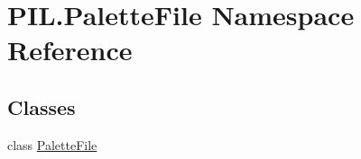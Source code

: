 \hypertarget{namespacePIL_1_1PaletteFile}{}\section{P\+I\+L.\+Palette\+File Namespace Reference}
\label{namespacePIL_1_1PaletteFile}
\subsection*{Classes}
\begin{DoxyCompactItemize}
\item 
class \hyperlink{classPIL_1_1PaletteFile_1_1PaletteFile}{Palette\+File}
\end{DoxyCompactItemize}
